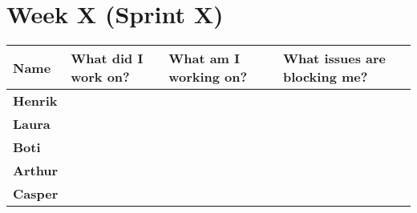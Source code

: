 \documentclass[landscape]{article}
\begin{document}
    \section{Week X (Sprint X)}
    \begin{table}[H]
        \begin{center}
            \begin{tabularx}{\linewidth}{L|L|L|L}
                
                \textbf{Name} & \textbf{What did I work on?} & \textbf{What am I working on? }& \textbf{What issues are blocking me?} \\
                \hline
                \textbf{Henrik} &  &  &  \\
                \hline
                \textbf{Laura} & & & \\
                \hline
                \textbf{Boti} & & & \\
                \hline
                \textbf{Arthur} & & & \\
                \hline
                \textbf{Casper} &  &  & 
            \end{tabularx}
        \end{center}
    \end{table}
\end{document}

